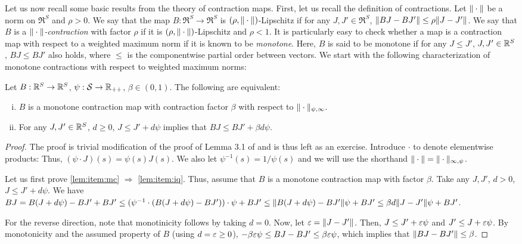 Let us now recall some basic results from the theory of contraction maps.
First, let us recall the definition of contractions. Let $\|\cdot\|$ be a norm on $\Re^S$ and $\rho>0$.
We say that the map $B: \Re^S \to \Re^S$ is $(\rho,\|\cdot\|)$-Lipschitz if for any $J,J'\in \Re^S$, $\| BJ - BJ' \| \le \rho \|J-J'\|$. We say that $B$ is a \emph{$\|\cdot\|$-contraction} with factor $\rho$ 
if it is $(\rho,\|\cdot\|)$-Lipschitz and $\rho<1$. It is particularly easy to check whether a map is a contraction map with respect to a weighted maximum norm 
if it is known to be \emph{monotone}.
Here, $B$ is said to be monotone if for any $J\le J'$, $J,J'\in \mathbb{R}^S$, $BJ \le BJ'$ also holds, where $\le$ is the componentwise
partial order between vectors. We start with the following characterization of monotone contractions with respect to weighted maximum norms: 
\begin{lemma}
\label{lem:maxnormmn}
Let $B:\mathbb{R}^S \to \mathbb{R}^S$, $\psi: \mathcal{S} \to \mathbb{R}_{++}$, $\beta\in (0,1)$.
The following are equivalent:
\begin{enumerate}[(i)]
\item $B$ is a monotone contraction map with contraction factor $\beta$ with respect to $\|\cdot\|_{\psi,\infty}$.
\label{lem:item:mc}
\item For any $J,J'\in \mathbb{R}^S$, $d\ge 0$, $J \le J' + d \psi$ implies that $BJ \le BJ' + \beta d \psi$.
\label{lem:item:iq}
\end{enumerate}
\end{lemma}
\begin{proof}
The proof is  trivial modification of the proof of Lemma 3.1 of \cite{Kall17} and is thus left as an exercise.
Introduce $\cdot$ to denote elementwise products: Thus, $(\psi \cdot J)(s) = \psi(s) J(s)$. 
We also let $\psi^{-1}(s) = 1/\psi(s)$ and we will use the shorthand $\|\cdot\| = \|\cdot\|_{\infty,\psi}$.

Let us first prove \eqref{lem:item:mc} $\Rightarrow $ \eqref{lem:item:iq}. 
Thus, assume that $B$ is a monotone contraction
map with factor $\beta$. Take any $J,J'$, $d>0$, $J \le J'+ d\psi$. 
We have $BJ = B(J + d \psi) - B J' + B J' \le (\psi^{-1} \cdot (B(J + d \psi) - B J' ))\cdot \psi + BJ'
\le \|B(J+d\psi) - BJ'\| \psi + BJ' \le \beta d \|J-J'\| \psi +  BJ'$.

For the reverse direction, note that monotinicity follows by taking $d=0$.
Now, let $\varepsilon = \|J-J'\|$. Then, $J \le J'+ \varepsilon \psi$ and $J' \le J+\varepsilon \psi$.
By monotonicity and the assumed property of $B$ (using $d=\varepsilon\ge 0$), 
$-\beta \varepsilon \psi \le BJ - BJ' \le \beta \varepsilon \psi$, which implies
that $\|BJ - BJ'\| \le \beta$.
\fi
\end{proof}
